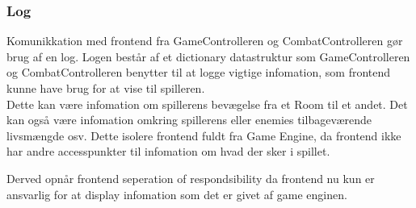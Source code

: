 \subsubsection{Log}
Komunikkation med frontend fra GameControlleren og CombatControlleren
gør brug af en log.
Logen består af et dictionary datastruktur som GameControlleren og 
CombatControlleren benytter til at logge vigtige infomation, som 
frontend kunne have brug for at vise til spilleren. \\

\noindent Dette kan være infomation om spillerens bevægelse fra
et Room til et andet. Det kan også være infomation omkring spillerens
eller enemies tilbageværende livsmængde osv. Dette isolere frontend 
fuldt fra Game Engine, da frontend ikke har andre accesspunkter til
infomation om hvad der sker i spillet. 

Derved opnår frontend seperation of respondsibility da frontend nu 
kun er ansvarlig for at display infomation som det er givet af game
enginen.

\newpage
